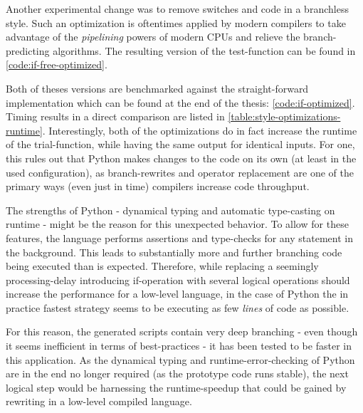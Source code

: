 Another experimental change was to remove switches and code in a branchless style.
Such an optimization is oftentimes applied by modern compilers to take advantage of the \emph{pipelining} powers of modern CPUs and relieve the branch-predicting algorithms.
The resulting version of the test-function can be found in \ref{code:if-free-optimized}.

Both of theses versions are benchmarked against the straight-forward implementation which can be found at the end of the thesis: \ref{code:if-optimized}.
Timing results in a direct comparison are listed in \autoref{table:style-optimizations-runtime}.
Interestingly, both of the \glqq optimizations\grqq{} do in fact increase the runtime of the trial-function, while having the same output for identical inputs.
For one, this rules out that Python makes changes to the code on its own (at least in the used configuration), as branch-rewrites and operator replacement are one of the primary ways (even just in time) compilers increase code throughput.

The strengths of Python - dynamical typing and automatic type-casting on runtime - might be the reason for this unexpected behavior.
To allow for these features, the language performs assertions and type-checks for any statement in the background.
This leads to substantially more and further branching code being executed than is expected.
Therefore, while replacing a seemingly processing-delay introducing if-operation with several logical operations should increase the performance for a low-level language, in the case of Python the in practice fastest strategy seems to be executing as few \emph{lines} of code as possible.

For this reason, the generated scripts contain very deep branching - even though it seems inefficient in terms of best-practices - it has been tested to be faster in this application.
As the dynamical typing and runtime-error-checking of Python are in the end no longer required (as the prototype code runs stable), the next logical step would be harnessing the runtime-speedup that could be gained by rewriting in a low-level compiled language.